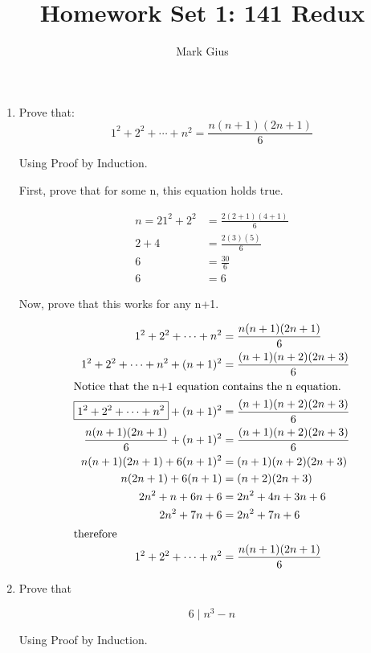 \documentclass[11pt]{article}
\begin{document}
\author{Mark Gius}
\title{Homework Set 1: 141 Redux}
\maketitle

\begin{enumerate}

\item %

Prove that:
\[
1^2 + 2^2 + \cdots + n^2 = \frac{n(n+1)(2n+1)}{6}
\]

Using Proof by Induction.

First, prove that for some n, this equation holds true.

\begin{align*}
n = 2
1^2 + 2^2 & = \frac{2(2+1)(4+1)}{6} \\
2 + 4 & = \frac{2(3)(5)}{6} \\
6 &= \frac{30}{6} \\
6 &= 6
\end{align*}

Now, prove that this works for any n+1.

\begin{align*}
1^2 + 2^2 + \cdots + n^2 & = \frac{n(n+1)(2n+1)}{6} \\
1^2 + 2^2 + \cdots + n^2 + (n+1)^ 2 & = \frac{(n+1)(n+2)(2n+3)}{6} \\
\intertext{Notice that the n+1 equation contains the n equation.}
\boxed{1^2 + 2^2 + \cdots + n^2 } + (n+1)^ 2 & = \frac{(n+1)(n+2)(2n+3)}{6} \\
\frac{n(n+1)(2n+1)}{6} + (n+1)^2 & = \frac{(n+1)(n+2)(2n+3)}{6} \\
n(n+1)(2n+1) + 6(n+1)^2 & = (n+1)(n+2)(2n+3) \\
n(2n+1) + 6(n+1) & = (n+2)(2n+3) \\
2n^2 + n + 6n + 6 & = 2n^2 + 4n + 3n + 6 \\
2n^2 + 7n + 6 &= 2n^2 + 7n + 6 \\
\intertext{therefore}
1^2 + 2^2 + \cdots + n^2 & = \frac{n(n+1)(2n+1)}{6}
\end{align*}

\item %
Prove that

\[
6 \mid n^3 - n
\]

Using Proof by Induction.


\end{enumerate}
\end{document}
